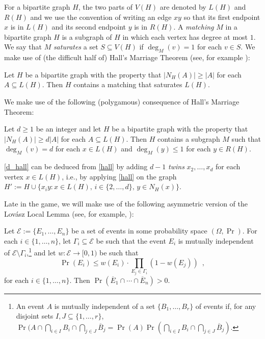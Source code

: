 \documentclass{patmorin}
\newcommand{\defin}[1]{\emph{\color{brightmaroon}#1}}
\begin{document}
For a  bipartite graph $H$, the two parts of $V(H)$ are denoted by $L(H)$ and $R(H)$ and we use the convention of writing an edge $xy$ so that its first endpoint $x$ is in $L(H)$ and its second endpoint $y$ is in $R(H)$.  A \defin{matching} $M$ in a bipartite graph $H$ is a subgraph of $H$ in which each vertex has degree at most $1$.  We say that $M$ \defin{saturates} a set $S\subseteq V(H)$ if $\deg_M(v)=1$ for each $v\in S$.  We make use of (the difficult half of) Hall's Marriage Theorem (see, for example \citet[Theorem~2.1.2]{diestel:graph}):

\begin{thm}\label{hall}
  Let $H$ be a bipartite graph with the property that $|N_H(A)|\ge |A|$ for each $A\subseteq L(H)$.  Then $H$ contains a matching that saturates $L(H)$.
\end{thm}

We make use of the following (polygamous) consequence of Hall's Marriage Theorem:
\begin{cor}\label{d_hall}
  Let $d\ge 1$ be an integer and let $H$ be a bipartite graph with the property that $|N_H(A)|\ge d|A|$ for each $A\subseteq L(H)$.  Then $H$ contains a subgraph $M$ such that $\deg_M(v)=d$ for each $x\in L(H)$ and $\deg_M(y)\le 1$ for each $y\in R(H)$.
\end{cor}

\cref{d_hall} can be deduced from \cref{hall} by adding $d-1$ \defin{twins} $x_2,\ldots,x_d$ for each vertex $x\in L(H)$, i.e., by applying \cref{hall} on the graph $H':=H\cup\{x_iy:x\in L(H),\, i\in\{2,\ldots,d\},\, y\in N_H(x)\}$.


Late in the game, we will make use of the following asymmetric version of the Lovász Local Lemma (see, for example, \citet[Lemma~5.1.1]{alon.spencer:probabilistic}):

\begin{lem}\label{weighted_lovasz}
  Let $\mathcal{E}:=\{E_1,\ldots,E_n\}$ be a set of events in some probability space $(\Omega,\Pr)$.  For each $i\in\{1,\ldots,n\}$, let $\Gamma_i\subseteq \mathcal{E}$ be such that the event $E_i$ is mutually independent of $\mathcal{E}\setminus \Gamma_i$,\footnote{An event $A$ is mutually independent of a set $\{B_1,\ldots,B_r\}$ of events if, for any disjoint sets $I,J\subseteq\{1,\ldots,r\}$, $\Pr(A\cap\bigcap_{i\in I} B_i\cap\bigcap_{j\in J} \overline{B}_j=\Pr(A)\Pr(\bigcap_{i\in I} B_i\cap\bigcap_{j\in J} \overline{B}_j)$.} and let $w:\mathcal{E}\to[0,1)$ be such that
  \[
      \Pr(E_i) \le w(E_i)\cdot\prod_{E_j\in\Gamma_i}(1-w(E_j))  \enspace ,
  \]
  for each $i\in\{1,\ldots,n\}$.
  Then $\Pr(\overline{E}_1\cap\cdots\cap\overline{E}_n) > 0$.
\end{lem}
\end{document}
